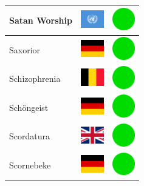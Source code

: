 \documentclass[12pt, a4paper, twoside]{report}
\begin{document}
\begin{center}
\begin{longtable}{|p{5cm}|p{2cm}|p{2cm}|}
Satan Worship & \includegraphics[width=1cm]{4x3/un} & \includegraphics[width=1cm]{likes/y} \\ \hline
Saxorior & \includegraphics[width=1cm]{4x3/de} & \includegraphics[width=1cm]{likes/y} \\ \hline
Schizophrenia & \includegraphics[width=1cm]{4x3/be} & \includegraphics[width=1cm]{likes/y} \\ \hline
Schöngeist & \includegraphics[width=1cm]{4x3/de} & \includegraphics[width=1cm]{likes/y} \\ \hline
Scordatura & \includegraphics[width=1cm]{4x3/gb} & \includegraphics[width=1cm]{likes/y} \\ \hline
Scornebeke & \includegraphics[width=1cm]{4x3/de} & \includegraphics[width=1cm]{likes/y} \\ \hline

\end{longtable}
\end{center}
\end{document}
